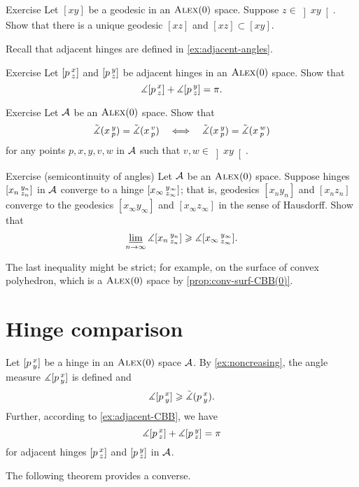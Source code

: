 \begin{thm}{Exercise}\label{ex:pi-angle}
Let $[xy]$ be a geodesic in an $\textsc{Alex}(0)$ space.
Suppose $z\in \left]xy\right[$. Show that there is a unique geodesic $[xz]$ and $[xz]\subset [xy]$.
\end{thm}

Recall that adjacent hinges are defined in \ref{ex:adjacent-angles}.

\begin{thm}[!]{Exercise}\label{ex:adjacent-CBB}
Let $[p\,{}^{x}_{z}]$ and $[p\,{}^{y}_{z}]$ be adjacent hinges in an $\textsc{Alex}(0)$ 
space.
Show that
\[\measuredangle[p\,{}^{x}_{z}]+\measuredangle[p\,{}^{y}_{z}]= \pi.\]
\end{thm}


\begin{thm}{Exercise}\label{ex:pxyvw}
Let $\mathcal{A}$ be an $\textsc{Alex}(0)$ 
space.
Show that  
\[
\tilde\measuredangle(x\,{}^{y}_{p})=\tilde\measuredangle(x\,{}^{v}_{p})
\quad\Longleftrightarrow\quad
\tilde\measuredangle(x\,{}^{y}_{p})=\tilde\measuredangle(x\,{}^{w}_{p})
\]
for any points
$p,x,y,v,w$ in $\mathcal{A}$ such that $v,w\in \left]xy\right[$.
\end{thm}



\begin{thm}{Exercise (semicontinuity of angles)}\label{ex:angle-lim}
Let $\mathcal{A}$ be an $\textsc{Alex}(0)$ space.
Suppose hinges $[x_n\,{}^{y_n}_{z_n}]$ in $\mathcal{A}$ converge to a hinge $[x_\infty\,{}^{y_\infty}_{z_\infty}]$;
that is, geodesics $[x_ny_n]$ and $[x_nz_n]$ converge to the geodesics $[x_\infty y_\infty]$ and $[x_\infty z_\infty]$ in the sense of Hausdorff.
Show that 
\[\varliminf_{n\to\infty}\measuredangle [x_n\,{}^{y_n}_{z_n}]\geqslant \measuredangle [x_\infty\,{}^{y_\infty}_{z_\infty}].\]
\end{thm}

The last inequality might be strict;
for example, on the surface of convex polyhedron, which is a $\textsc{Alex}(0)$ space by \ref{prop:conv-surf-CBB(0)}.

\section{Hinge comparison}

Let $[p\,{}^{x}_{y}]$ be a hinge in an $\textsc{Alex}(0)$ space $\mathcal{A}$.
By \ref{ex:noncreasing}, the angle measure $\measuredangle[p\,{}^{x}_{y}]$ is defined and
\[\measuredangle[p\,{}^{x}_{y}]\geqslant \tilde\measuredangle(p\,{}^{x}_{y}).\]
Further, according to \ref{ex:adjacent-CBB}, we have 
\[\measuredangle[p\,{}^{x}_{z}]+\measuredangle[p\,{}^{y}_{z}]=\pi\]
for adjacent hinges $[p\,{}^{x}_{z}]$ and $[p\,{}^{y}_{z}]$ in $\mathcal{A}$.

The following theorem provides a converse.

